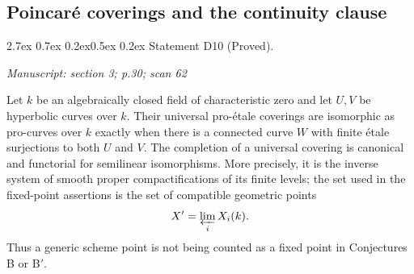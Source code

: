 \documentclass[11pt,a4paper]{article}
\makeatletter
\newcommand{\passage}[1]{\par\smallskip\noindent\textit{Manuscript: #1}\par\smallskip}
\renewcommand\paragraph{\@startsection{paragraph}{4}{\z@}%
  {2.7ex \@plus 0.7ex \@minus 0.2ex}{0.5ex \@plus 0.2ex}%
  {\normalfont\normalsize\bfseries}}
\makeatother
\begin{document}
\subsection{Poincar\'e coverings and the continuity clause}

\paragraph{Statement D10 (Proved).}\label{res:D10}
\passage{section 3; p.30; scan 62}

Let $k$ be an algebraically closed field of characteristic zero and let
$U,V$ be hyperbolic curves over $k$.  Their universal pro-\'etale
coverings are isomorphic as pro-curves over $k$ exactly when there is a
connected curve $W$ with finite \'etale surjections to both $U$ and $V$.
The completion of a universal covering is canonical and functorial for
semilinear isomorphisms.  More precisely, it is the inverse system of
smooth proper compactifications of its finite levels; the set used in
the fixed-point assertions is the set of compatible geometric points
\[
                       X'=\varprojlim_i X_i(k).
\]
Thus a generic scheme point is not being counted as a fixed point in
Conjectures B or B$'$.
\end{document}
